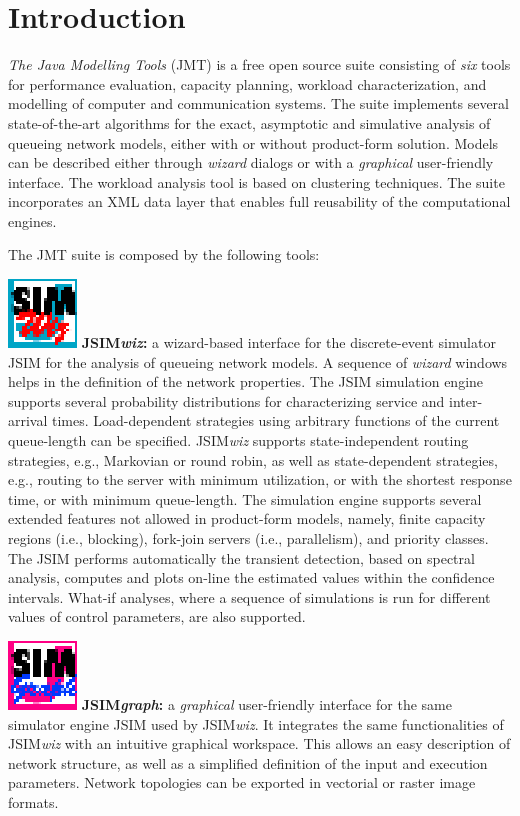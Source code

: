 \chapter{Introduction}
\emph{The Java Modelling Tools} (JMT) is a free open source suite
consisting of \emph{six} tools  for performance evaluation,
capacity planning, workload characterization, and modelling of
computer and communication systems. The suite implements several
state-of-the-art algorithms for the exact, asymptotic and
simulative analysis of queueing network models, either with or
without product-form solution. Models can be described either
through \emph{wizard} dialogs or with a \emph{graphical}
user-friendly interface. The workload analysis tool is based on
clustering techniques. The suite incorporates an XML data layer
that enables full reusability of the computational engines.

The JMT suite is composed by the following tools: %

\medskip \noindent \includegraphics[scale=.5]{img/JSIMIcon}
\textbf{JSIM\emph{wiz}:} a wizard-based interface for the
discrete-event simulator JSIM for the analysis of queueing network
models. A sequence of \emph{wizard} windows helps in the
definition of the network properties. The JSIM simulation engine
supports several probability distributions for characterizing
service and inter-arrival times. Load-dependent strategies using
arbitrary functions of the current queue-length can be specified.
JSIM\emph{wiz} supports state-independent routing strategies,
e.g., Markovian or round robin, as well as state-dependent
strategies, e.g., routing to the server with minimum utilization,
or with the shortest response time, or with minimum queue-length.
The simulation engine supports several extended features not
allowed in product-form models, namely, finite capacity regions
(i.e., blocking), fork-join servers (i.e., parallelism), and
priority classes. The JSIM performs automatically the transient
detection, based on spectral analysis, computes and plots on-line
the estimated values within the confidence intervals. What-if analyses, where
a sequence of simulations is run for different values of control
parameters, are also supported.

\medskip \noindent \includegraphics[scale=.5]{img/JMODELIcon}
\textbf{JSIM\emph{graph}:} a \emph{graphical} user-friendly
interface for the same simulator engine JSIM used by
JSIM\emph{wiz}. It integrates the same functionalities of
JSIM\emph{wiz} with an intuitive graphical workspace. This allows
an easy description of network structure, as well as a simplified
definition of the input and execution parameters. Network
topologies can be exported in vectorial or raster image formats.

